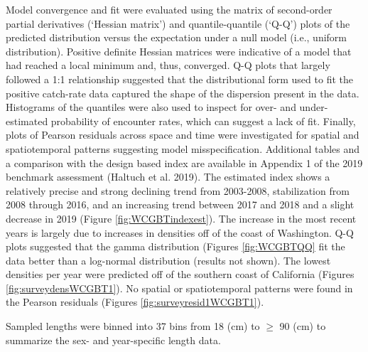 \documentclass[11pt,
  english,
  a4paper,
]{article}
\begin{document}

Model convergence and fit were evaluated using the matrix of second-order partial derivatives (`Hessian matrix') and quantile-quantile (`Q-Q') plots of the predicted distribution versus the expectation under a null model (i.e., uniform distribution). Positive definite Hessian matrices were indicative of a model that had reached a local minimum and, thus, converged. Q-Q plots that largely followed a 1:1 relationship suggested that the distributional form used to fit the positive catch-rate data captured the shape of the dispersion present in the data. Histograms of the quantiles were also used to inspect for over- and under-estimated probability of encounter rates, which can suggest a lack of fit. Finally, plots of Pearson residuals across space and time were investigated for spatial and spatiotemporal patterns suggesting model misspecification. Additional tables and a comparison with the design based index are available in Appendix 1 of the 2019 benchmark assessment {(Haltuch et al. 2019)\leavevmode\tagmcend\tagstructend}. The estimated index shows a relatively precise and strong declining trend from 2003-2008, stabilization from 2008 through 2016, and an increasing trend between 2017 and 2018 and a slight decrease in 2019 (Figure \ref{fig:WCGBTindexest}). The increase in the most recent years is largely due to increases in densities off of the coast of Washington. Q-Q plots suggested that the gamma distribution (Figures \ref{fig:WCGBTQQ} fit the data better than a log-normal distribution (results not shown). The lowest densities per year were predicted off of the southern coast of California (Figures \ref{fig:surveydensWCGBT1}). No spatial or spatiotemporal patterns were found in the Pearson residuals (Figures \ref{fig:surveyresid1WCGBT1}).

\leavevmode\tagmcend\tagstructend\par

Sampled lengths were binned into 37 bins from 18 (cm) to {\(\geq\)\leavevmode\tagmcend\tagstructend} 90 (cm) to summarize the sex- and year-specific length data.

\end{document}
